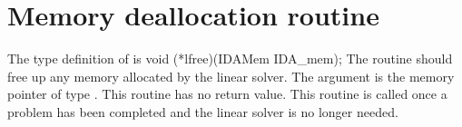 
\section{Memory deallocation routine}
The type definition of  is
{
  void (*lfree)(IDAMem IDA\_mem);
}
{
  The routine  should free up any memory allocated by the linear
  solver.
}
{
  The argument  is the {\ida} memory pointer of type .
}
{
  This routine has no return value.
}
{
  This routine is called once a problem has been completed and the 
  linear solver is no longer needed.
}